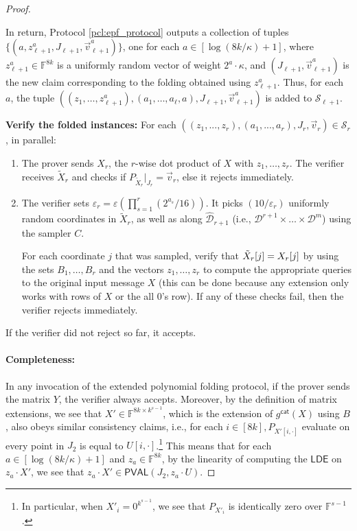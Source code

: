 \documentclass[10pt,a4paper]{article}
\makeatletter
\newcommand{\PVAL}{\mathsf{PVAL}}
\newcommand{\LDE}{\mathsf{LDE}}
\newcommand{\F}{\mathbb{F}}
\newcommand{\sD}{\mathcal{D}}
\newenvironment{protocol}[1][htb]{
    \renewcommand{\ALG@name}{Protocol}
    \begin{algorithm}[#1]
    }{\end{algorithm}
}
\makeatother
\begin{document}
\begin{proof}
\begin{protocol}[htp]
\begin{algorithmic}{}
\begin{enumerate}
    In return, Protocol \ref{pcl:epf_protocol} outputs a collection of tuples $\{(a,z^a_{\ell+1},J_{\ell+1},\Vec{v}^a_{\ell+1})\}$, one for each $a \in [\log (8k/\kappa)+1]$, where $z^a_{\ell+1} \in \F^{8k}$ is a uniformly random vector of weight $2^a \cdot \kappa$, and $(J_{\ell+1},\Vec{v}^a_{\ell+1})$ is the new claim corresponding to the folding obtained using $z^a_{\ell+1}$. Thus, for each $a$, the tuple $((z_1, \dots, z^a_{\ell+1}),(a_1, \dots, a_\ell, a), J_{\ell+1}, \Vec{v}^a_{\ell+1})$ is added to $\mathcal{S}_{\ell+1}$.
\end{enumerate}
    
\STATE \textbf{Verify the folded instances:} For each $((z_{1}, . . . , z_{r}),(a_{1}, . . . , a_{r}), J_{r}, \vec{v}_{r}) \in \mathcal{S}_{r}$, in parallel:
\begin{enumerate}
    \item The prover sends $X_{r}$, the $r$-wise dot product of $X$ with $z_1, \dots, z_r$. The verifier receives $\widetilde{X}_{r}$ and checks if $P_{\widetilde{X}_{r}} \vert_{J_r} = \vec{v}_{r}$, else it rejects immediately.
    \item The verifier sets $\varepsilon_{r} = \varepsilon \left( \prod_{s=1}^{r}(2^{a_{s}}/16) \right)$. It picks $(10/\varepsilon_{r})$ uniformly random coordinates in $\widetilde{X}_{r}$, as well as along $\widehat{\sD}_{r+1}$ (i.e., $\sD^{r+1} \times \dots \times \sD^m$) using the sampler $C$. 
        
    For each coordinate $j$ that was sampled, verify that $\Tilde{X}_{r}[j] = X_r[j]$ by using the sets $B_1, \dots, B_r$ and the vectors $z_1, \dots, z_r$ to compute the appropriate queries to the original input message $X$ (this can be done because any extension only works with rows of $X$ or the all $0$'s row). If any of these checks fail, then the verifier rejects immediately.
\end{enumerate}
        
\STATE If the verifier did not reject so far, it accepts.
\end{algorithmic}
\end{protocol}

\paragraph*{Completeness:}  In any invocation of the extended polynomial folding protocol, if the prover sends the matrix $Y$, the verifier always accepts. Moreover, by the definition of matrix extensions, we see that $X' \in \F^{8k \times k^{s-1}}$, which is the extension of $g^{\mathsf{cat}}(X)$ using $B$, also obeys similar consistency claims, i.e., for each $i \in [8k], P_{X'[i,\cdot]}$
evaluate on every point in $J_2$ is equal to $U[i,\cdot]$.\footnote{In particular, when $X'_i = 0^{k^{s-1}}$, we see that $P_{X'_i}$ is identically zero over $\F^{s-1}$.} This means that for each $a \in [\log (8k/\kappa)+1]$ and $z_a \in \F^{8k}$, by the linearity of computing the $\LDE$ on $z_a \cdot X'$, we see that $z_a \cdot X' \in \PVAL(J_2, z_a \cdot U)$.


\end{proof}
\end{document}
